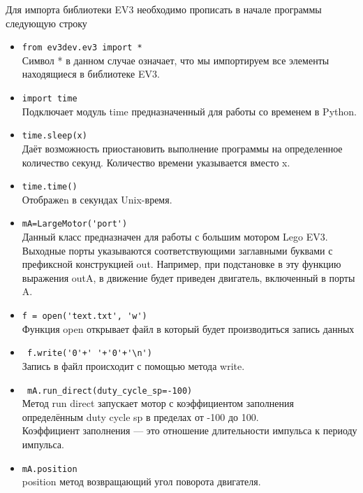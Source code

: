 \documentclass[12pt,a4paper,openany]{extarticle}
\begin{document}
Для импорта библиотеки EV3 необходимо прописать в начале программы следующую строку\\
\begin{itemize}
\item \verb|from ev3dev.ev3 import *|\\
Символ * в данном случае означает, что мы импортируем все элементы находящиеся в библиотеке EV3.

\item \verb|import time|\\
Подключает модуль time предназначенный для работы со временем в Python.

\item \verb|time.sleep(x)|\\
Даёт возможность приостановить выполнение программы на определенное количество секунд. Количество времени указывается вместо x. 

\item \verb|time.time()|\\
Отображеn в секундах Unix-время.  

\item \verb|mA=LargeMotor('port')|\\
Данный класс предназначен для работы с большим мотором  Lego EV3.
\\Выходные порты указываются соответствующими заглавными буквами с префиксной конструкцией out. 
Например, при подстановке в эту функцию выражения outA, в движение будет приведен двигатель, включенный в порты A. 
 
\item \verb|f = open('text.txt', 'w')|\\
Функция open открывает файл в который будет производиться запись данных
\item \verb| f.write('0'+' '+'0'+'\n')|\\
Запись в файл происходит с помощью метода write.\\
\item \verb| mA.run_direct(duty_cycle_sp=-100)|\\
Метод run direct запускает мотор с коэффициентом заполнения определённым duty cycle sp в пределах от -100 до 100.\\
Коэффициент заполнения --- это отношение длительности импульса к периоду импульса. 
\item \verb|mA.position|\\
position метод возвращающий угол поворота двигателя.

\end{itemize}
\end{document}
